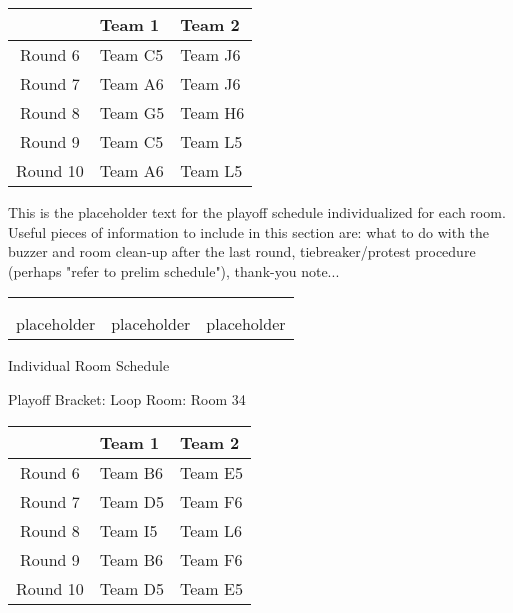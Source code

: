 \documentclass{article}%
\begin{document}
%
\begin{tabularx}{\textwidth}{|c|Y|Y|}%
\hline%
&Team 1&Team 2\\%
\hline%
Round 6&Team C5&Team J6\\%
Round 7&Team A6&Team J6\\%
Round 8&Team G5&Team H6\\%
Round 9&Team C5&Team L5\\%
Round 10&Team A6&Team L5\\%
\hline%
\end{tabularx}%
\vspace*{16pt}%
\linebreak%
This is the placeholder text for the playoff schedule individualized for each room. Useful pieces of information to include in this section are: what to do with the buzzer and room clean{-}up after the last round, tiebreaker/protest procedure (perhaps "refer to prelim schedule"), thank{-}you note...%
\vspace*{30pt}%
\newline%
%
\begin{tabularx}{\textwidth}{YYY}%
  &  &  \\%
\\%
placeholder&placeholder&placeholder\\%
\end{tabularx}%
\newpage%
\begin{center}%
\begin{Huge}%
Individual Room Schedule%
\end{Huge}%
\vspace*{16pt}%
\linebreak%
\begin{Large}%
Playoff Bracket: Loop \hfill Room: Room 34%
\end{Large}%
\end{center}%
%
\begin{tabularx}{\textwidth}{|c|Y|Y|}%
\hline%
&Team 1&Team 2\\%
\hline%
Round 6&Team B6&Team E5\\%
Round 7&Team D5&Team F6\\%
Round 8&Team I5&Team L6\\%
Round 9&Team B6&Team F6\\%
Round 10&Team D5&Team E5\\%
\hline%
\end{tabularx}%
\end{document}
